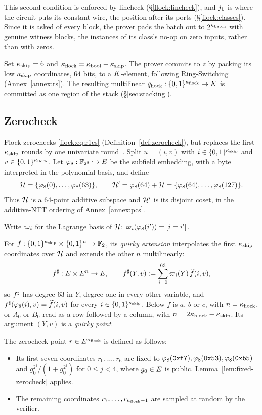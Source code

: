 This second condition is enforced by lincheck (\S\ref{flock:lincheck}), and $j_{\mathbf{1}}$ is where the circuit puts its constant wire, the position after its ports (\S\ref{flock:classes}). Since it is asked of every block, the prover pads the batch out to $2^{\kappa_{\mathrm{batch}}}$ with genuine witness blocks, the instances of its class's no-op on zero inputs, rather than with zeros.

Set $\kappa_{\mathrm{skip}}=6$ and $\kappa_{\mathrm{flock}}=\kappa_{\mathrm{bool}}-\kappa_{\mathrm{skip}}$. The prover commits to $z$ by packing its low $\kappa_{\mathrm{skip}}$ coordinates, $64$ bits, to a $K$-element, following Ring-Switching (Annex~\ref{annex:rs}). The resulting multilinear $q_{\mathrm{flock}}:\{0,1\}^{\kappa_{\mathrm{flock}}}\to K$ is committed as one region of the stack (\S\ref{sec:stacking}).


\subsection{Zerocheck}\label{flock:zerocheck}

Flock zerochecks \eqref{flock:eq:r1cs} (Definition~\ref{def:zerocheck}), but replaces the first $\kappa_{\mathrm{skip}}$ rounds by one univariate round~\cite{Gru24}. Split $u=(i,v)$ with $i\in\{0,1\}^{\kappa_{\mathrm{skip}}}$ and $v\in\{0,1\}^{\kappa_{\mathrm{flock}}}$. Let $\varphi_{8}:\mathbb{F}_{2^8}\hookrightarrow E$ be the subfield embedding, with a byte interpreted in the polynomial basis, and define
\[
\mathcal{H}=\{\varphi_{8}(0),\ldots,\varphi_{8}(63)\},\qquad \mathcal{H}'=\varphi_{8}(64)+\mathcal{H}=\{\varphi_{8}(64),\ldots,\varphi_{8}(127)\}.
\]
Thus $\mathcal{H}$ is a $64$-point additive subspace and $\mathcal{H}'$ is its disjoint coset, in the additive-NTT ordering of Annex~\ref{annex:pcs}.

Write $\varpi_i$ for the Lagrange basis of $\mathcal{H}$: $\varpi_i(\varphi_{8}(i'))=[i=i']$.

\begin{definition}\label{def:quirky}
For $f:\{0,1\}^{\kappa_{\mathrm{skip}}}\times\{0,1\}^{n}\to\mathbb{F}_2$, its \emph{quirky extension} interpolates the first $\kappa_{\mathrm{skip}}$ coordinates over $\mathcal{H}$ and extends the other $n$ multilinearly:
\[
  f^{\sharp}:E\times E^{n}\to E,\qquad
  f^{\sharp}(Y,v):=\sum_{i=0}^{63}\varpi_i(Y)\,\widetilde{f}(i,v),
\]
so $f^{\sharp}$ has degree $63$ in $Y$, degree one in every other variable, and $f^{\sharp}(\varphi_{8}(i),v)=\widetilde{f}(i,v)$ for every $i\in\{0,1\}^{\kappa_{\mathrm{skip}}}$. Below $f$ is $a$, $b$ or $c$, with $n=\kappa_{\mathrm{flock}}$, or $A_0$ or $B_0$ read as a row followed by a column, with $n=2\kappa_{\mathrm{block}}-\kappa_{\mathrm{skip}}$. Its argument $(Y,v)$ is a \emph{quirky point}.
\end{definition}

The zerocheck point $r \in E^{\kappa_{\mathrm{flock}}}$ is defined as follows:
\begin{itemize}
  \item Its first seven coordinates $r_0, \dots, r_6$ are fixed to $\varphi_{8}(\mathtt{0xf7}),\varphi_{8}(\mathtt{0x53}),\varphi_{8}(\mathtt{0xb5})$ and $g_0^{2^j}/(1+g_0^{2^j})$ for $0\leq j<4$, where $g_0\in E$ is public. Lemma~\ref{lem:fixed-zerocheck} applies.
  \item The remaining coordinates $r_7,\dots,r_{\kappa_{\mathrm{flock}}-1}$ are sampled at random by the verifier.
\end{itemize}

